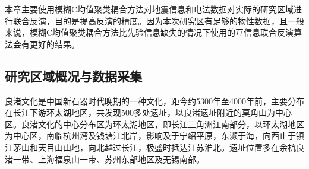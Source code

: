 本章主要使用模糊C均值聚类耦合方法对地震信息和电法数据对实际的研究区域进行联合反演，目的是提高反演的精度。因为本次研究区有足够的物性数据，且一般来说，模糊C均值聚类耦合方法比先验信息缺失的情况下使用的互信息联合反演算法会有更好的结果。

\subsection{研究区域概况与数据采集}

良渚文化是中国新石器时代晚期的一种文化，距今约5300年至4000年前，主要分布在长江下游环太湖地区，共发现500多处遗址，以良渚遗址附近的莫角山为中心区。良渚文化的中心分布区为环太湖地区，即长江三角洲江南部分，以环太湖地区为中心区，南临杭州湾及钱塘江北岸，影响及于宁绍平原，东濒于海，向西止于镇江茅山和天目山山地，向北越过长江，极盛时抵达江苏淮北。遗址位置多在余杭良渚一带、上海福泉山一带、苏州东部地区及无锡南部。\cite{杨博2021基于聚类和多元地质统计学的电}

